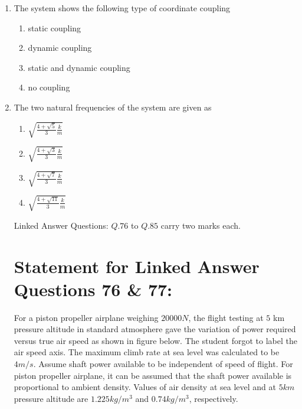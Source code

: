 \documentclass[journal]{IEEEtran}
\begin{document}
\begin{enumerate}

\item The system shows the following type of coordinate coupling
\begin{enumerate}
    \item static coupling
    \item dynamic coupling
    \item static and dynamic coupling
    \item no coupling\\
\end{enumerate}
\item The two natural frequencies of the system are given as
\begin{enumerate}
    \item $\sqrt{\frac{4+\sqrt{5}}{3}\frac{k}{m}}$
    \item $\sqrt{\frac{4+\sqrt{3}}{3}\frac{k}{m}}$
    \item $\sqrt{\frac{4+\sqrt{7}}{3}\frac{k}{m}}$
    \item $\sqrt{\frac{4+\sqrt{11}}{3}\frac{k}{m}}$
\end{enumerate}
Linked Answer Questions: $Q.76$ to $Q.85$ carry two marks each.
\section*{Statement for Linked Answer Questions 76 \& 77:}
For a piston propeller airplane weighing $20000 N$, the flight testing at $5$ km pressure altitude in standard atmosphere gave the variation of power required versus true air speed as shown in figure below. The student forgot to label the air speed axis. The maximum climb rate at sea level was calculated to be $4 m/s$. Assume shaft power available to be independent of speed of flight. For piston propeller airplane, it can be assumed that the shaft power available is proportional to ambient density. Values of air density at sea level and at $5 km$ pressure altitude are $1.225 kg/m^3$ and $0.74 kg/m^3$, respectively.




\end{enumerate}
\end{document}
